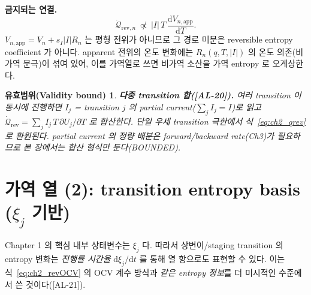 \documentclass[11pt,a4paper]{article}
\newtheorem*{boundbox}{유효범위(Validity bound)}
\newcommand{\dd}{\mathrm{d}}
\newcommand{\app}{\mathrm{app}}
\newcommand{\rev}{\mathrm{rev}}
\newcommand{\AL}[1]{\textsf{[AL-#1]}}
\begin{document}
\textbf{금지되는 연결.}
\begin{equation}
\dot{\mathcal Q}_{\rev,n}\ \not\propto\ |I|\,T\,\frac{\dd V_{n,\app}}{\dd T}.
\label{eq:ch2_forbidden}
\end{equation}
$V_{n,\app}=V_n+s_I|I|R_n$ 는 평형 전위가 아니므로 그 경로 미분은 reversible entropy coefficient 가 아니다.
apparent 전위의 온도 변화에는 $R_n(q,T,|I|)$ 의 온도 의존(비가역 분극)이 섞여 있어, 이를 가역열로 쓰면 비가역
소산을 가역 entropy 로 오계상한다.
\begin{boundbox}
\textbf{다중 transition 합(\AL{20}).} 여러 transition 이 동시에 진행하면 $I_j$ = transition $j$ 의 partial
current($\sum_j I_j=I$)로 읽고 $\dot{\mathcal Q}_{\rev}=\sum_j I_j\,T\,\partial U_j/\partial T$ 로 합산한다.
단일 우세 transition 극한에서 식~\eqref{eq:ch2_qrev} 로 환원된다. partial current 의 정량 배분은 forward/backward
rate(Ch3)가 필요하므로 본 장에서는 합산 형식만 둔다(BOUNDED).
\end{boundbox}

\section{가역 열 (2): transition entropy basis ($\xi_j$ 기반)}\label{sec:ch2_revxi}
Chapter 1 의 핵심 내부 상태변수는 $\xi_j$ 다. 따라서 상변이/staging transition 의 entropy 변화는 \emph{진행률
시간율} $\dd\xi_j/\dd t$ 를 통해 열 항으로도 표현할 수 있다. 이는 식~\eqref{eq:ch2_revOCV} 의 OCV 계수 방식과
\emph{같은 entropy 정보}를 더 미시적인 수준에서 쓴 것이다(\AL{21}).
\end{document}
